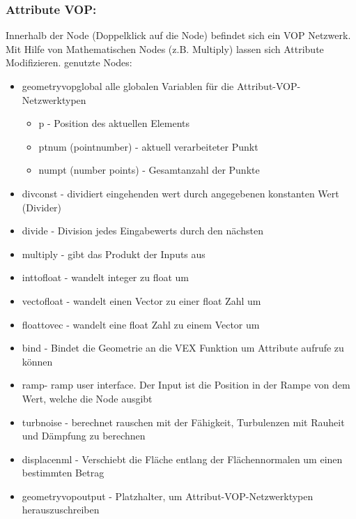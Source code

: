 \subsubsection*{​Attribute VOP:}
Innerhalb der Node (Doppelklick auf die Node) befindet sich ein VOP Netzwerk. Mit Hilfe von Mathematischen Nodes (z.B. Multiply) lassen sich Attribute Modifizieren.
genutzte Nodes:
\begin{itemize}
\item geometryvopglobal 	alle globalen Variablen für die Attribut-VOP-Netzwerktypen
	\begin{itemize}
	\item p - Position des aktuellen Elements
	\item ptnum (pointnumber) - aktuell verarbeiteter Punkt 
	\item numpt (number points) - Gesamtanzahl der Punkte
	\end{itemize}
\item divconst - dividiert eingehenden wert durch angegebenen konstanten Wert (Divider)
\item divide - Division jedes Eingabewerts durch den nächsten 
\item multiply	 - gibt das Produkt der Inputs aus
\item inttofloat - wandelt integer zu float um
\item vectofloat - wandelt einen Vector zu einer float Zahl um
\item floattovec - wandelt eine float Zahl zu einem Vector um
\item bind - Bindet die Geometrie an die VEX Funktion um Attribute aufrufe zu können
\item ramp- ramp user interface. Der Input ist die Position in der Rampe von dem Wert, welche die Node ausgibt
\item turbnoise - berechnet rauschen mit der Fähigkeit, Turbulenzen mit Rauheit und Dämpfung zu berechnen
\item displacenml - Verschiebt die Fläche entlang der Flächennormalen um einen bestimmten Betrag
\item geometryvopoutput - Platzhalter, um Attribut-VOP-Netzwerktypen herauszuschreiben
\end{itemize}

